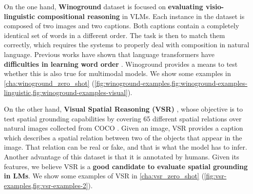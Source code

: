 On the one hand, \textbf{Winoground} dataset \cite{thrush2022winoground} is focused on \textbf{evaluating visio-linguistic compositional reasoning} in VLMs. Each instance in the dataset is composed of two images and two captions. Both captions contain a completely identical set of words in a different order. The task is then to match them correctly, which requires the systems to properly deal with composition in natural language. Previous works have shown that language transformers have \textbf{difficulties in learning word order} \cite{sinha2020unnatural,sinha2021matterslittle}. Winoground provides a means to test whether this is also true for multimodal models. We show some examples in \cref{cha:winoground_zero_shot} (\cref{fig:winoground-examples,fig:winoground-examples-linguistic,fig:winoground-examples-visual}).

On the other hand, \textbf{Visual Spatial Reasoning (VSR)} \cite{liu2022visual}, whose objective is to test spatial grounding capabilities by covering 65 different spatial relations over natural images collected from COCO \cite{lin2014microsoft}. Given an image, VSR provides a caption which describes a spatial relation between two of the objects that appear in the image. That relation can be real or fake, and that is what the model has to infer. Another advantage of this dataset is that it is annotated by humans. Given its features, we believe VSR is a \textbf{good candidate to evaluate spatial grounding in LMs}. We show some examples of VSR in \cref{cha:vsr_zero_shot} (\cref{fig:vsr-examples,fig:vsr-examples-2}).